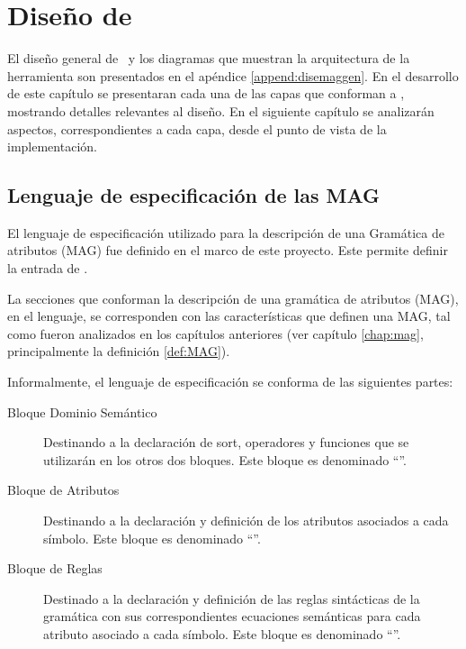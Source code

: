 \chapter{Diseño de \maggen}
\label{chap:disen_}
\minitoc

El diseño general de \maggen\ y los diagramas que muestran la arquitectura de la herramienta son presentados en el apéndice \ref{append:disemaggen}. En el desarrollo de este capítulo se presentaran cada una de las capas que conforman a \maggen, mostrando detalles relevantes al diseño. En el siguiente capítulo se analizarán aspectos, correspondientes a cada capa, desde el punto de vista de la implementación.
 
\section{Lenguaje de especificación de las MAG}
\label{sec:lenguajeMAG}

El lenguaje de especificación utilizado para la descripción de una Gramática de atributos (MAG) fue definido en el marco de este proyecto. Este permite definir la entrada de \maggen.
 
La secciones que conforman la descripción de una gramática de atributos (MAG), en el lenguaje, se corresponden con las características que definen una MAG, tal como fueron analizados en los capítulos anteriores (ver capítulo \ref{chap:mag}, principalmente la definición \ref{def:MAG}).
 
Informalmente, el lenguaje de especificación se conforma de las siguientes partes:

\begin{description}
\item [Bloque Dominio Semántico] Destinando a la declaración de sort, operadores y funciones que se utilizarán en los otros dos bloques. Este bloque es denominado ``''.

\item [Bloque de Atributos] Destinando a la declaración y definición de los atributos asociados a cada símbolo. Este bloque es denominado ``''.

\item [Bloque de Reglas] Destinado a la declaración y definición de las reglas sintácticas de la gramática con sus correspondientes ecuaciones semánticas para cada atributo asociado a cada símbolo. Este bloque es denominado ``''.
\end{description}

